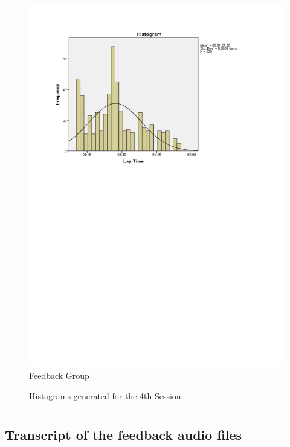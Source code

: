 \begin{figure}
\begin{minipage}{0.45\textwidth}
		\includegraphics[width=\textwidth]{charts/4-1}
		Feedback Group
	\end{minipage}
	\caption{Histograms generated for the 4th Session}
	\label{fig:hist-4}
\end{figure}

\chapter{}

%
%
%
%

\section{Transcript of the feedback audio files}

